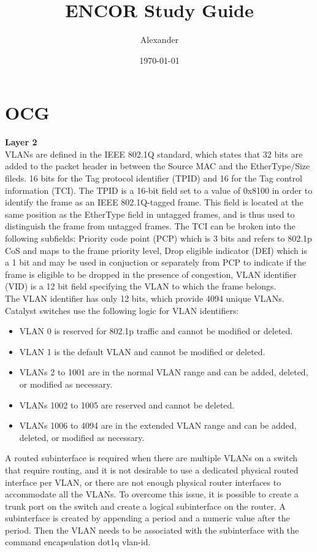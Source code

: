 \documentclass{article}
\title{ENCOR Study Guide}
\author{Alexander}
\date{\today}
\begin{document}
\maketitle

\section*{OCG}

\noindent\textbf{Layer 2}\\

	VLANs are defined in the IEEE 802.1Q standard, which states that 32 bits are added to the packet header in between the Source MAC and the EtherType/Size fileds. 16 bits for the Tag protocol identifier (TPID) and 16 for the Tag control information (TCI). The TPID is a 16-bit field set to a value of 0x8100 in order to identify the frame as an IEEE 802.1Q-tagged frame. This field is located at the same position as the EtherType field in untagged frames, and is thus used to distinguish the frame from untagged frames. The TCI can be broken into the following subfields: Priority code point (PCP) which is 3 bits and refers to 802.1p CoS and maps to the frame priority level, Drop eligible indicator (DEI) which is a 1 bit and may be used in conjuction or separately from PCP to indicate if the frame is eligible to be dropped in the presence of congestion, VLAN identifier (VID) is a 12 bit field specifying the VLAN to which the frame belongs.\\

	The VLAN identifier has only 12 bits, which provide 4094 unique VLANs. Catalyst switches use the following logic for VLAN identifiers:
\begin{itemize}
\item VLAN 0 is reserved for 802.1p traffic and cannot be modified or deleted.
\item VLAN 1 is the default VLAN and cannot be modified or deleted.
\item VLANs 2 to 1001 are in the normal VLAN range and can be added, deleted, or modified as necessary.
\item VLANs 1002 to 1005 are reserved and cannot be deleted.
\item VLANs 1006 to 4094 are in the extended VLAN range and can be added, deleted, or modified as necessary.
\end{itemize}

	A routed subinterface is required when there are multiple VLANs on a switch that require routing, and it is not desirable to use a dedicated physical routed interface per VLAN, or there are not enough physical router interfaces to accommodate all the VLANs. To overcome this issue, it is possible to create a trunk port on the switch and create a logical subinterface on the router. A subinterface is created by appending a period and a numeric value after the period. Then the VLAN needs to be associated with the subinterface with the command encapsulation dot1q vlan-id.\\
\end{document}
